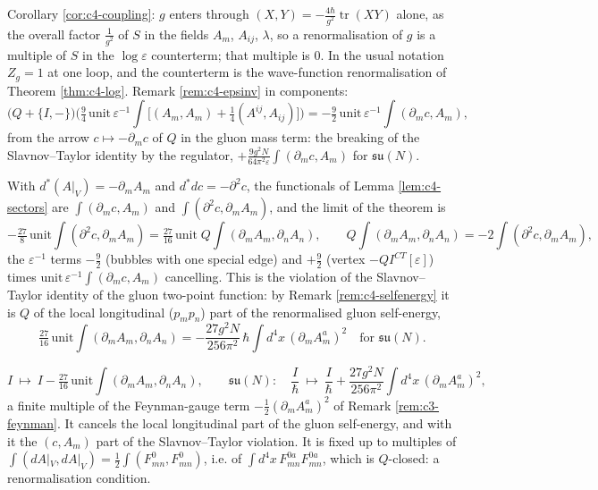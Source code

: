 \begin{remark}
Corollary \ref{cor:c4-coupling}: $g$ enters through $(X,Y)=-\frac{4\hbar}{g^2}\operatorname{tr}(XY)$ alone, as the overall factor $\frac1{g^2}$ of $S$ in the fields $A_m$, $A_{ij}$, $\lambda$, so a renormalisation of $g$ is a multiple of $S$ in the $\log\varepsilon$ counterterm; that multiple is $0$. In the usual notation $Z_g=1$ at one loop, and the counterterm is the wave-function renormalisation of Theorem \ref{thm:c4-log}. Remark \ref{rem:c4-epsinv} in components:
\[
\big(Q+\{I,-\}\big)\Big(\tfrac94\,\mathrm{unit}\,\varepsilon^{-1}\!\int\!\Big[(A_m,A_m)+\tfrac14(A^{ij},A_{ij})\Big]\Big)=-\tfrac92\,\mathrm{unit}\,\varepsilon^{-1}\!\int(\partial_mc,A_m),
\]
from the arrow $c\mapsto-\partial_mc$ of $Q$ in the gluon mass term: the breaking of the Slavnov--Taylor identity by the regulator, $+\frac{9g^2N}{64\pi^2\varepsilon}\int(\partial_mc,A_m)$ for $\mathfrak{su}(N)$.
\end{remark}

\begin{remark}
With $d^*(A|_V)=-\partial_mA_m$ and $d^*dc=-\partial^2c$, the functionals of Lemma \ref{lem:c4-sectors} are $\int(\partial_mc,A_m)$ and $\int(\partial^2c,\partial_mA_m)$, and the limit of the theorem is
\[
-\tfrac{27}8\,\mathrm{unit}\int(\partial^2c,\partial_mA_m)=\tfrac{27}{16}\,\mathrm{unit}\;Q\!\int(\partial_mA_m,\partial_nA_n),\qquad Q\!\int(\partial_mA_m,\partial_nA_n)=-2\!\int(\partial^2c,\partial_mA_m),
\]
the $\varepsilon^{-1}$ terms $-\tfrac92$ (bubbles with one special edge) and $+\tfrac92$ (vertex $-QI^{CT}[\varepsilon]$) times $\mathrm{unit}\,\varepsilon^{-1}\int(\partial_mc,A_m)$ cancelling. This is the violation of the Slavnov--Taylor identity of the gluon two-point function: by Remark \ref{rem:c4-selfenergy} it is $Q$ of the local longitudinal ($p_mp_n$) part of the renormalised gluon self-energy,
\[
\tfrac{27}{16}\,\mathrm{unit}\int(\partial_mA_m,\partial_nA_n)=-\frac{27g^2N}{256\pi^2}\,\hbar\int d^4x\,(\partial_mA^a_m)^2\quad\text{for }\mathfrak{su}(N).
\]
\end{remark}

\begin{remark}
\[
I\ \mapsto\ I-\tfrac{27}{16}\,\mathrm{unit}\int(\partial_mA_m,\partial_nA_n),\qquad \mathfrak{su}(N):\quad \frac I\hbar\ \mapsto\ \frac I\hbar+\frac{27g^2N}{256\pi^2}\int d^4x\,(\partial_mA^a_m)^2,
\]
a finite multiple of the Feynman-gauge term $-\tfrac12(\partial_mA^a_m)^2$ of Remark \ref{rem:c3-feynman}. It cancels the local longitudinal part of the gluon self-energy, and with it the $(c,A_m)$ part of the Slavnov--Taylor violation. It is fixed up to multiples of $\int(dA|_V,dA|_V)=\tfrac12\int(F^0_{mn},F^0_{mn})$, i.e. of $\int d^4x\,F^{0a}_{mn}F^{0a}_{mn}$, which is $Q$-closed: a renormalisation condition.
\end{remark}

